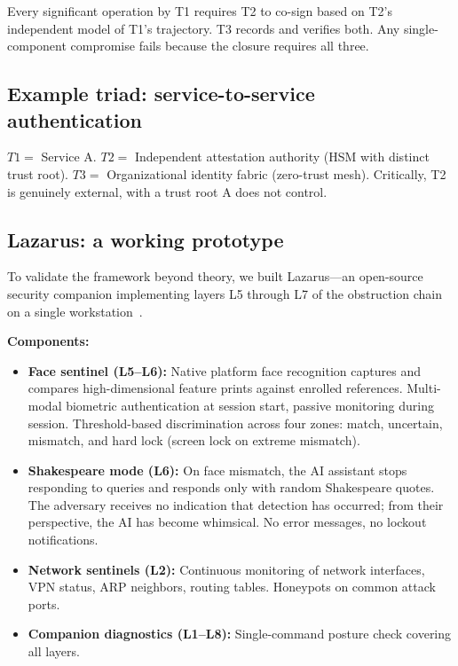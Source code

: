 \documentclass[11pt,a4paper]{article}
\theoremstyle{definition}
\theoremstyle{remark}
\begin{document}
Every significant operation by T1 requires T2 to co-sign based on T2's independent model of T1's trajectory. T3 records and verifies both. Any single-component compromise fails because the closure requires all three.

\subsection{Example triad: service-to-service authentication}

$T1 =$ Service A. $T2 =$ Independent attestation authority (HSM with distinct trust root). $T3 =$ Organizational identity fabric (zero-trust mesh). Critically, T2 is genuinely external, with a trust root A does not control.

\subsection{Lazarus: a working prototype}

To validate the framework beyond theory, we built Lazarus---an open-source security companion implementing layers L5 through L7 of the obstruction chain on a single workstation~\cite{lazarus2026}.

\textbf{Components:}
\begin{itemize}
\item \textbf{Face sentinel (L5--L6):} Native platform face recognition captures and compares high-dimensional feature prints against enrolled references. Multi-modal biometric authentication at session start, passive monitoring during session. Threshold-based discrimination across four zones: match, uncertain, mismatch, and hard lock (screen lock on extreme mismatch).

\item \textbf{Shakespeare mode (L6):} On face mismatch, the AI assistant stops responding to queries and responds only with random Shakespeare quotes. The adversary receives no indication that detection has occurred; from their perspective, the AI has become whimsical. No error messages, no lockout notifications.

\item \textbf{Network sentinels (L2):} Continuous monitoring of network interfaces, VPN status, ARP neighbors, routing tables. Honeypots on common attack ports.

\item \textbf{Companion diagnostics (L1--L8):} Single-command posture check covering all layers.
\end{itemize}
\end{document}
